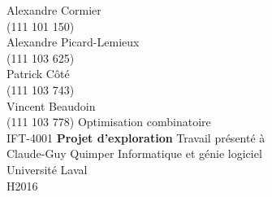 \thispagestyle{empty}
\begin{center}
Alexandre Cormier\\
(111 101 150)\\
\medskip
Alexandre Picard-Lemieux\\
(111 103 625)\\
\medskip
Patrick Côté\\
(111 103 743)\\
\medskip
Vincent Beaudoin\\
(111 103 778)
\vfill
Optimisation combinatoire\\
IFT-4001
\vfill
\textbf{Projet d'exploration}
\vfill
Travail présenté à\\
Claude-Guy Quimper
\vfill
Informatique et génie logiciel\\
Université Laval\\
H2016
\end{center}
